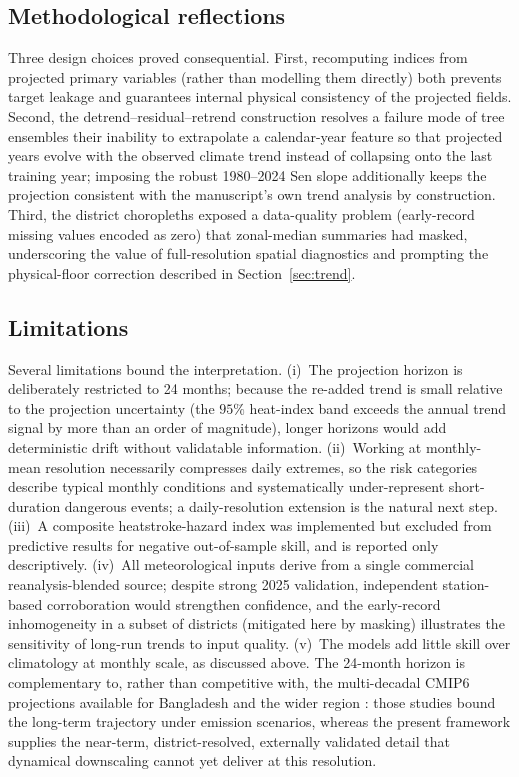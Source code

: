 \documentclass[review,11pt]{elsarticle}
\begin{document}
\subsection{Methodological reflections}
Three design choices proved consequential. First, recomputing indices from
projected primary variables (rather than modelling them directly) both prevents
target leakage and guarantees internal physical consistency of the projected
fields. Second, the detrend--residual--retrend construction resolves a failure
mode of tree ensembles their inability to extrapolate a calendar-year
feature so that projected years evolve with the observed climate trend instead
of collapsing onto the last training year; imposing the robust 1980--2024 Sen
slope additionally keeps the projection consistent with the manuscript's own
trend analysis by construction. Third, the district choropleths exposed a
data-quality problem (early-record missing values encoded as zero) that
zonal-median summaries had masked, underscoring the value of full-resolution
spatial diagnostics and prompting the physical-floor correction described in
Section~\ref{sec:trend}.

\subsection{Limitations}
Several limitations bound the interpretation. (i)~The projection horizon is
deliberately restricted to 24 months; because the re-added trend is small relative
to the projection uncertainty (the $95\%$ heat-index band exceeds the annual
trend signal by more than an order of magnitude), longer horizons would add
deterministic drift without validatable information. (ii)~Working at monthly-mean
resolution necessarily compresses daily extremes, so the risk categories describe
typical monthly conditions and systematically under-represent short-duration
dangerous events; a daily-resolution extension is the natural next step.
(iii)~A composite heatstroke-hazard index was implemented but excluded from
predictive results for negative out-of-sample skill, and is reported only
descriptively. (iv)~All meteorological inputs derive from a single commercial
reanalysis-blended source; despite strong 2025 validation, independent
station-based corroboration would strengthen confidence, and the early-record
inhomogeneity in a subset of districts (mitigated here by masking) illustrates the
sensitivity of long-run trends to input quality. (v)~The models add little skill
over climatology at monthly scale, as discussed above. The 24-month horizon is
complementary to, rather than competitive with, the multi-decadal CMIP6 projections
available for Bangladesh and the wider region \citep{khatun2024,kushwaha2026humidex}:
those studies bound the long-term trajectory under emission scenarios, whereas the
present framework supplies the near-term, district-resolved, externally validated
detail that dynamical downscaling cannot yet deliver at this resolution.
\end{document}
